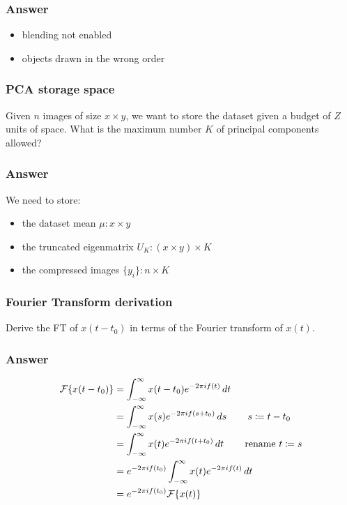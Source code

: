 \documentclass[a4paper,10pt]{article}
\begin{document}
\subsubsection{Answer}
\begin{itemize}
    \item blending not enabled
    \item objects drawn in the wrong order
\end{itemize}

\subsubsection{PCA storage space}
Given \( n \) images of size \( x \times y \), we want to store the dataset given a budget of \( Z \) units of space. What is the maximum number \( K \) of principal components allowed?
\subsubsection{Answer}
We need to store:
\begin{itemize}
    \item the dataset mean \( \mu: x \times y \)
    \item the truncated eigenmatrix \( U_K: (x \times y) \times K \)
    \item the compressed images \( \{y_i\}: n \times K \)
\end{itemize}
\subsubsection{Fourier Transform derivation}
Derive the FT of \( x(t-t_{0}) \) in terms of the Fourier transform of \( x(t) \).
\subsubsection{Answer}
\begin{align*}
    \mathcal{F}\{x(t-t_{0})\} &= \int_{-\infty}^\infty x(t-t_{0}) e^{-2\pi i f(t)} \mathop{dt} \\
			      &= \int_{-\infty}^\infty x(s) e^{-2 \pi i f(s + t_{0})} \mathop{ds} \tag*{\( s\coloneqq t-t_{0} \)} \\
			      &= \int_{-\infty}^\infty x(t) e^{-2 \pi if(t+t_{0})} \mathop{dt} \tag*{rename \( t\coloneqq s \)} \\
			      &= e^{-2\pi if(t_0)} \int_{-\infty}^\infty x(t) e^{-2\pi i f(t)} \mathop{dt} \\
			      &= e^{-2\pi if(t_{0})} \mathcal{F}\{x(t)\}
\end{align*}
\end{document}
